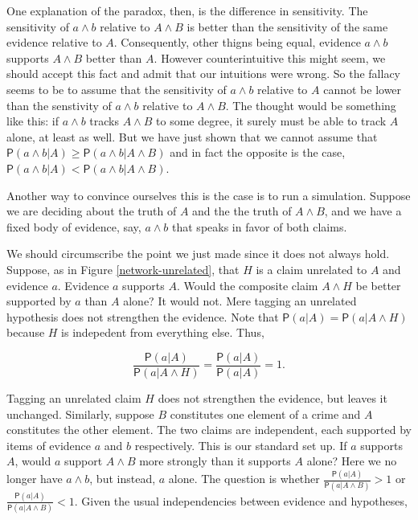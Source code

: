 \documentclass[
  10pt,
  dvipsnames,enabledeprecatedfontcommands]{scrartcl}
\newcommand{\pr}[1]{\mathsf{P}(#1)}
\begin{document}
One explanation of the paradox, then, is the difference in sensitivity.
The sensitivity of \(a\wedge b\) relative to \(A\wedge B\) is better
than the sensitivity of the same evidence relative to \(A\).
Consequently, other thigns being equal, evidence \(a\wedge b\) supports
\(A\wedge B\) better than \(A\). However counterintuitive this might
seem, we should accept this fact and admit that our intuitions were
wrong. So the fallacy seems to be to assume that the sensitivity of
\(a\wedge b\) relative to \(A\) cannot be lower than the senstivity of
\(a\wedge b\) relative to \(A\wedge B\). The thought would be something
like this: if \(a \wedge b\) tracks \(A\wedge B\) to some degree, it
surely must be able to track \(A\) alone, at least as well. But we have
just shown that we cannot assume that
\(\pr{a\wedge b \vert A} \geq \pr{a\wedge b \vert A\wedge B}\) and in
fact the opposite is the case,
\(\pr{a\wedge b \vert A} < \pr{a\wedge b \vert A\wedge B}\).

Another way to convince ourselves this is the case is to run a
simulation. Suppose we are deciding about the truth of \(A\) and the the
truth of \(A\wedge B\), and we have a fixed body of evidence, say,
\(a\wedge b\) that speaks in favor of both claims.

We should circumscribe the point we just made since it does not always
hold. Suppose, as in Figure \ref{network-unrelated}, that \(H\) is a
claim unrelated to \(A\) and evidence \(a\). Evidence \(a\) supports
\(A\). Would the composite claim \(A\wedge H\) be better supported by
\(a\) than \(A\) alone? It would not. Mere tagging an unrelated
hypothesis does not strengthen the evidence. Note that
\(\pr{a \vert A}=\pr{a \vert A \wedge H}\) because \(H\) is indepedent
from everything else. Thus,

\[\frac{\pr{a \vert A}}{\pr{a \vert A \wedge H}}=\frac{\pr{a \vert A}}{\pr{a \vert A}}=1.\]

\noindent Tagging an unrelated claim \(H\) does not strengthen the
evidence, but leaves it unchanged. Similarly, suppose \(B\) constitutes
one element of a crime and \(A\) constitutes the other element. The two
claims are independent, each supported by items of evidence \(a\) and
\(b\) respectively. This is our standard set up. If \(a\) supports
\(A\), would \(a\) support \(A\wedge B\) more strongly than it supports
\(A\) alone? Here we no longer have \(a\wedge b\), but instead, \(a\)
alone. The question is whether
\(\frac{\pr{a \vert A}}{\pr{a \vert A \wedge B}}>1\) or
\(\frac{\pr{a \vert A}}{\pr{a \vert A \wedge B}}<1\). Given the usual
independencies between evidence and hypotheses,
\end{document}
